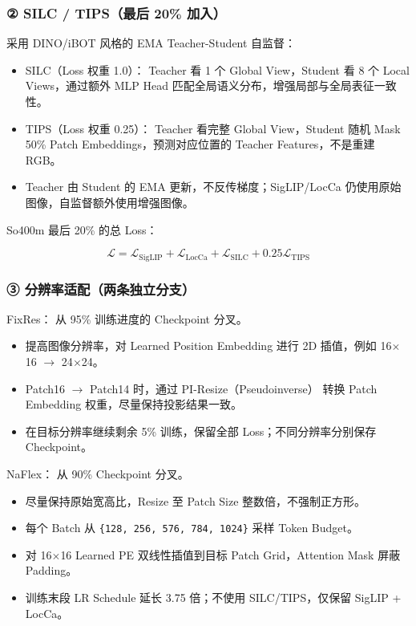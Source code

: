 \subsubsection{{②} SILC /\allowbreak{} TIPS（最后 20\% 加入）}
采用 DINO/\allowbreak{}iBOT 风格的 EMA Teacher-\allowbreak{}Student 自监督：\par
\begin{itemize}
\item SILC（Loss 权重 1.\allowbreak{}0）： Teacher 看 1 个 Global View，Student 看 8 个 Local Views，通过额外 MLP Head 匹配全局语义分布，增强局部与全局表征一致性。
\item TIPS（Loss 权重 0.\allowbreak{}25）： Teacher 看完整 Global View，Student 随机 Mask 50\% Patch Embeddings，预测对应位置的 Teacher Features，不是重建 RGB。
\item Teacher 由 Student 的 EMA 更新，不反传梯度；SigLIP/\allowbreak{}LocCa 仍使用原始图像，自监督额外使用增强图像。
\end{itemize}
So400m 最后 20\% 的总 Loss：\par
\[
\mathcal{L}=\mathcal{L}_{\mathrm{SigLIP}}+\mathcal{L}_{\mathrm{LocCa}}+\mathcal{L}_{\mathrm{SILC}}+0.25\mathcal{L}_{\mathrm{TIPS}}
\]
\subsubsection{{③} 分辨率适配（两条独立分支）}
FixRes： 从 95\% 训练进度的 Checkpoint 分叉。\par
\begin{itemize}
\item 提高图像分辨率，对 Learned Position Embedding 进行 2D 插值，例如 16\(\times\)16 \(\rightarrow\) 24\(\times\)24。
\item Patch16 \(\rightarrow\) Patch14 时，通过 PI-\allowbreak{}Resize（Pseudoinverse） 转换 Patch Embedding 权重，尽量保持投影结果一致。
\item 在目标分辨率继续剩余 5\% 训练，保留全部 Loss；不同分辨率分别保存 Checkpoint。
\end{itemize}
NaFlex： 从 90\% Checkpoint 分叉。\par
\begin{itemize}
\item 尽量保持原始宽高比，Resize 至 Patch Size 整数倍，不强制正方形。
\item 每个 Batch 从 \texttt{\{128, 256, 576, 784, 1024\}} 采样 Token Budget。
\item 对 16\(\times\)16 Learned PE 双线性插值到目标 Patch Grid，Attention Mask 屏蔽 Padding。
\item 训练末段 LR Schedule 延长 3.\allowbreak{}75 倍；不使用 SILC/\allowbreak{}TIPS，仅保留 SigLIP + LocCa。
\end{itemize}
